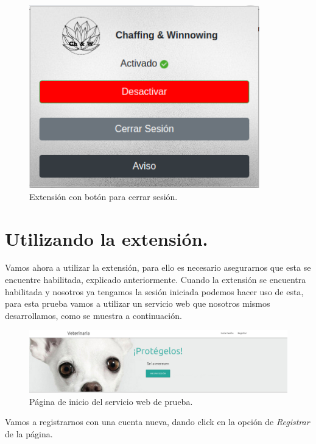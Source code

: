 \documentclass[12pt, a4paper, titlepage]{report}
\begin{document}
    	\begin{figure}[H]
    		\begin{center}	
    		\includegraphics[width=10cm]{./imagenes/Inicio_sesion/cerrarSesionPopup.png}
    		\caption{Extensión con botón para cerrar sesión.}
    		\label{fig:cerrarSesionPopup}
    		\end{center}
    	\end{figure}
        
        \section{Utilizando la extensión.}
    Vamos ahora a utilizar la extensión, para ello es necesario asegurarnos que esta se encuentre habilitada, explicado anteriormente. Cuando la extensión se encuentra habilitada y nosotros ya tengamos la sesión iniciada podemos hacer uso de esta, para esta prueba vamos a utilizar un servicio web que nosotros mismos desarrollamos, como se muestra a continuación.
    
    \begin{figure}[H]
		\begin{center}	
		\includegraphics[width=12cm]{./imagenes/Ejecucion/UI_homeServicioWeb.png}
		\caption{Página de inicio del servicio web de prueba.}
		\label{fig:homeServicioWeb}
		\end{center}
	\end{figure}
	
	Vamos a registrarnos con una cuenta nueva, dando click en la opción de \textit{Registrar} de la página. 
	
\end{document}
